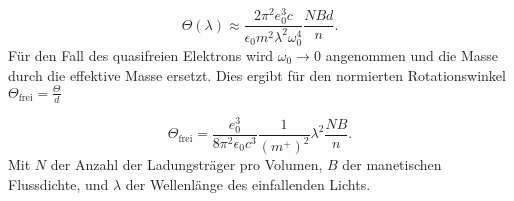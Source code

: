 \begin{equation}
    \Theta (\lambda) \approx \frac{2 \pi^2 e_0^3 c }{\epsilon_0 m^2 \lambda^2 \omega_0^4} \frac{N B d}{n}.
\end{equation}
Für den Fall des quasifreien Elektrons wird $\omega_0 \to 0$ angenommen 
und die Masse durch die effektive Masse ersetzt. 
Dies ergibt für den normierten Rotationswinkel $\Theta_{\text{frei}} = \frac{\Theta}{d}$

\begin{equation}
    \Theta_{\text{frei}} = \frac{e_0^3}{8 \pi^2 \epsilon_0 c^3} \frac{1}{(m^+)^2} \lambda^2 \frac{N B}{n}.
\end{equation}
Mit $N$ der Anzahl der Ladungsträger pro Volumen, $B$ der manetischen Flussdichte, 
und $\lambda$ der Wellenlänge des einfallenden Lichts.


